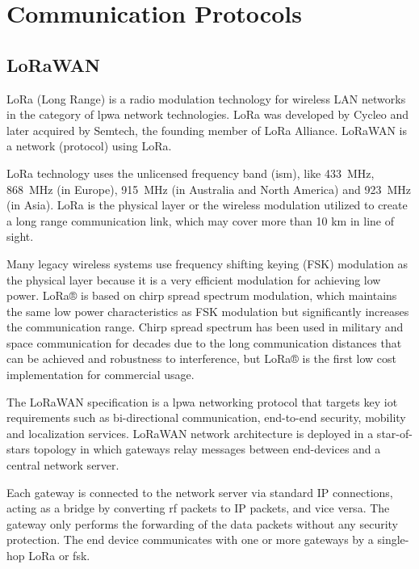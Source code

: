 \section{Communication Protocols}
\subsection{LoRaWAN}
LoRa (Long Range) is a radio modulation technology for wireless LAN networks in the category of \ac{lpwa} network technologies. LoRa was developed by Cycleo and later acquired by Semtech, the founding member of LoRa Alliance. LoRaWAN is a network (protocol) using LoRa. \cite{lora_alliance}

LoRa technology uses the unlicensed frequency band (\ac{ism}), like 433~MHz, 868~MHz (in Europe), 915~MHz (in Australia and North America) and 923~MHz (in Asia). LoRa is the physical layer or the wireless modulation utilized to create a long range communication link, which may cover more than 10 km in line of sight.

Many legacy wireless systems use frequency shifting keying (FSK) modulation as the physical layer because it is a very efficient modulation for achieving low power. LoRa® is based on chirp spread spectrum modulation, which maintains the same low power characteristics as FSK modulation but significantly increases the communication range. Chirp spread spectrum has been used in military and space communication for decades due to the long 
communication distances that can be achieved and robustness to interference, but LoRa® is the first low cost implementation for commercial usage. 





The LoRaWAN specification is a \ac{lpwa} networking protocol that targets key \ac{iot} requirements such as bi-directional communication, end-to-end security, mobility and localization services. LoRaWAN network architecture is deployed in a star-of-stars topology in which gateways relay messages between end-devices and a central network server.

Each gateway is connected to the network server via standard IP connections, acting as a bridge by converting \ac{rf} packets to IP packets, and vice versa. The gateway only performs the forwarding of the data packets without any security protection. The end device communicates with one or more gateways by a single-hop LoRa or \ac{fsk}.

